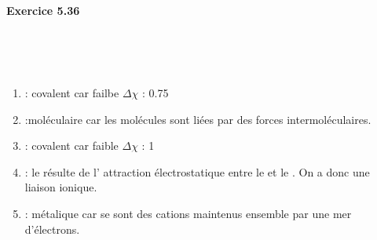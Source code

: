 \documentclass{article}
\newcommand\exercice[1]{%
\paragraph{#1}%
~\par
~\par}
\begin{document}
\exercice{Exercice 5.36}

\begin{enumerate}\renewcommand{\theenumi}{\alph{enumi}}
	\item	{} : covalent car failbe $\Delta \chi$ : 0.75
	\item	{} :moléculaire car les molécules sont liées par des forces intermoléculaires.
	\item	{} : covalent car faible $\Delta \chi$ : 1
	\item	{} : le  résulte de l'
				attraction électrostatique entre le 
				et le . On a donc une liaison ionique.
	\item	{} : métalique car se sont des cations maintenus ensemble par une mer d'électrons.
\end{enumerate}	
				
\end{document}
